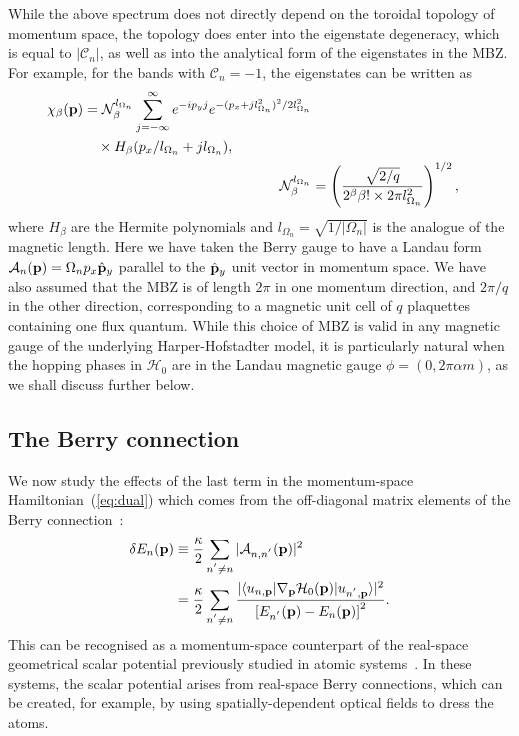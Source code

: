 While the above spectrum does not directly depend on the toroidal topology of momentum space, the topology does enter into the eigenstate degeneracy, which is equal to $|\mathcal{C}_n|$, as well as into the analytical form of the eigenstates in the MBZ. For example, for the bands with $\mathcal{C}_n = -1$, the eigenstates can be written as~\cite{price2014magnetic}
%
\begin{align}\label{eq:chi}
\begin{split}
 \chi_\beta (\mathbf{p}) &= \mathcal{N}_\beta^{l_{\Omega_n}} \sum_{j = - \infty}^{\infty} e^{- i p_y j } e^{ - ( p_x + j  l_{\Omega_n}^2 ) ^2 / 2 l_{\Omega_n}^2}\\
 &\quad \times H_\beta ( p_x / l_{\Omega_n} + j  l_{\Omega_n})  ,
\end{split}\\
 \mathcal{N}_\beta^{l_{\Omega_n}} &= \left( \frac{\sqrt{2/q}} {2^\beta\beta! \times 2 \pi l_{\Omega_n}^2} \right)^{1/2} , 
\end{align}
% 
where $H_\beta$ are the Hermite polynomials and $l_{\Omega_n} = \sqrt{1/|\Omega_n|}$ is the analogue of
the magnetic length. Here we have taken the Berry gauge to have a Landau form $\mathcal{A}_n(\mathbf{p}) = \Omega_n p_x \hat{\mathbf{p}}_y$ parallel to the $\hat{\mathbf{p}}_y$ unit vector in  momentum space. We have also assumed that the MBZ is of length $2 \pi$ in one momentum direction, and $2 \pi / q$ in the other direction, corresponding to a magnetic unit cell of $q$ plaquettes containing one flux quantum. While this choice of MBZ is valid in any magnetic gauge of the underlying Harper-Hofstadter model, it is particularly natural when the hopping phases in $\mathcal{H}_0$ are in the Landau magnetic gauge $\phi = (0, 2\pi\alpha m)$, as we shall discuss further below. 


\subsection{The Berry connection}\label{sec:berry-shift}

We now study the effects of the last term in the momentum-space Hamiltonian~(\ref{eq:dual}) which comes from the off-diagonal matrix elements of the Berry connection~\cite{berry}:
\begin{align}
  \delta E_n(\mathbf{p}) &\equiv \frac{\kappa}{2}\sum_{n^{'}\neq n} \vert \mathcal{A}_{n,n^{'}}(\mathbf{p}) \vert^2
  \notag \\
  &=
  \frac{\kappa}{2}\sum_{n^{'}\neq n} \frac{\vert \langle u_{n,\mathbf{p}} \vert\nabla_{\mathbf{p}}\mathcal{H}_0(\mathbf{p})\vert u_{n^{'},\mathbf{p}} \rangle \vert^2}{\left[E_{n^{'}}(\mathbf{p}) - E_{n}(\mathbf{p})\right]^2}.
  \label{eq:shift}
\end{align}
This can be recognised as a momentum-space counterpart of the real-space geometrical scalar potential previously studied in atomic systems~\cite{dum:1996, dutta:1999, dalibardrmp2011}. In these systems, the scalar potential arises from real-space Berry connections, which can be created, for example, by using spatially-dependent optical fields to dress the atoms. 
 
